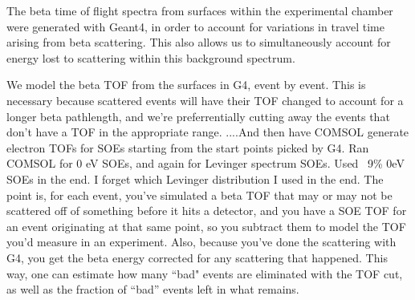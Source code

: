 
The beta time of flight spectra from surfaces within the experimental chamber were generated with Geant4, in order to account for variations in travel time arising from beta scattering.  This also allows us to simultaneously account for energy lost to scattering within this background spectrum.






We model the beta TOF from the surfaces in G4, event by event.  This is necessary because scattered  events will have their TOF changed to account for a longer beta pathlength, and we're preferrentially cutting away the events that don't have a TOF in the appropriate range.  ....And then have COMSOL generate electron TOFs for SOEs starting from the start points picked by G4.  Ran COMSOL for 0 eV SOEs, and again for Levinger spectrum SOEs.  Used ~9\% 0eV SOEs in the end.  I forget which Levinger distribution I used in the end.    The point is, for each event, you've simulated a beta TOF that may or may not be scattered off of something before it hits a detector, and you have a SOE TOF for an event originating at that same point, so you subtract them to model the TOF you'd measure in an experiment.  Also, because you've done the scattering with G4, you get the beta energy corrected for any scattering that happened.  This way, one can estimate %
how many ``bad" events are eliminated with the TOF cut, as well as the fraction of ``bad'' events left in what remains.


